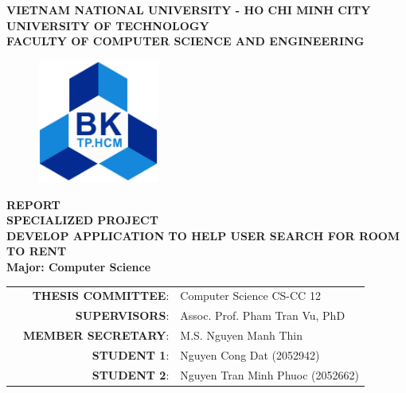 \begin{titlepage}
    \begin{center}
    \normalsize {\textbf{
    VIETNAM NATIONAL UNIVERSITY - HO CHI MINH CITY \\
    UNIVERSITY OF TECHNOLOGY \\
    FACULTY OF COMPUTER SCIENCE AND ENGINEERING}}
    \vspace{1cm}
    
    \begin{figure}[ht]
        \centering
        \includegraphics[width=4cm]{../Images/BK.png}
    \end{figure}
    
    \begin{center}
    \textbf{{\large REPORT}}\\
    \textbf{{\large SPECIALIZED PROJECT}}\\
    \vspace{1cm}
    {\fontsize{16}{18}\selectfont
    \textbf{{DEVELOP APPLICATION TO HELP USER SEARCH FOR ROOM TO RENT}}\\
    }
    \vspace{1cm}
    \textbf{{\large Major: Computer Science}}
    \end{center}
    
    \vspace{1cm}
    
    \begin{table}[h]
        \normalsize
        \begin{tabular}{r r l}
        \hspace{2 cm} & \textbf{THESIS COMMITTEE}: & Computer Science CS-CC 12 \\
        & \textbf{SUPERVISORS}: & Assoc. Prof. Pham Tran Vu, PhD \\ 
        & \textbf{MEMBER SECRETARY}: & M.S. Nguyen Manh Thin \\
        & \textbf{STUDENT 1}: & Nguyen Cong Dat (2052942)\\
        & \textbf{STUDENT 2}: & Nguyen Tran Minh Phuoc (2052662)\\ 
        \end{tabular}
    \end{table}
    \vspace{2cm}
    

\end{center}
\end{titlepage}
